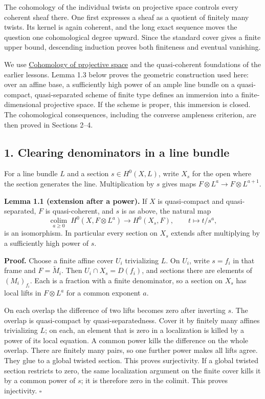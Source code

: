 \documentclass[11pt]{article}
\begin{document}
The cohomology of the individual twists on projective space controls
every coherent sheaf there. One first expresses a sheaf as a quotient of
finitely many twists. Its kernel is again coherent, and the long exact
sequence moves the question one cohomological degree upward. Since the
standard cover gives a finite upper bound, descending induction proves
both finiteness and eventual vanishing.

We use \href{cohomology-of-projective-space.md}{Cohomology of projective
space} and the quasi-coherent foundations of the earlier lessons. Lemma
1.3 below proves the geometric construction used here: over an affine
base, a sufficiently high power of an ample line bundle on a
quasi-compact, quasi-separated scheme of finite type defines an
immersion into a finite-dimensional projective space. If the scheme is
proper, this immersion is closed. The cohomological consequences,
including the converse ampleness criterion, are then proved in Sections
2--4.

\subsection{1. Clearing denominators in a line
bundle}\label{clearing-denominators-in-a-line-bundle}

For a line bundle \(L\) and a section \(s\in H^0(X,L)\), write \(X_s\)
for the open where the section generates the line. Multiplication by
\(s\) gives maps \(F\otimes L^a\to F\otimes L^{a+1}\).

\textbf{Lemma 1.1 (extension after a power).} If \(X\) is quasi-compact
and quasi-separated, \(F\) is quasi-coherent, and \(s\) is as above, the
natural map \[
\underset{a\ge0}{\operatorname{colim}}\ H^0(X,F\otimes L^a)
\longrightarrow H^0(X_s,F),\qquad t\longmapsto t/s^a,
\] is an isomorphism. In particular every section on \(X_s\) extends
after multiplying by a sufficiently high power of \(s\).

\textbf{Proof.} Choose a finite affine cover \(U_i\) trivializing \(L\).
On \(U_i\), write \(s=f_i\) in that frame and \(F=\widetilde M_i\). Then
\(U_i\cap X_s=D(f_i)\), and sections there are elements of
\((M_i)_{f_i}\). Each is a fraction with a finite denominator, so a
section on \(X_s\) has local lifts in \(F\otimes L^a\) for a common
exponent \(a\).

On each overlap the difference of two lifts becomes zero after inverting
\(s\). The overlap is quasi-compact by quasi-separatedness. Cover it by
finitely many affines trivializing \(L\); on each, an element that is
zero in a localization is killed by a power of its local equation. A
common power kills the difference on the whole overlap. There are
finitely many pairs, so one further power makes all lifts agree. They
glue to a global twisted section. This proves surjectivity. If a global
twisted section restricts to zero, the same localization argument on the
finite cover kills it by a common power of \(s\); it is therefore zero
in the colimit. This proves injectivity. \(\square\)
\end{document}
